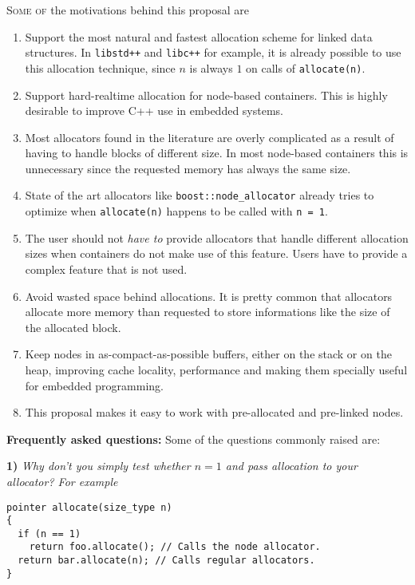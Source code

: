 \documentclass[11pt]{article}
\begin{document}
\textsc{Some of} the motivations behind this proposal are
\begin{enumerate}

\item Support the most natural and fastest allocation scheme for
linked data structures. In \texttt{libstd++} and \texttt{libc++}
for example, it is already possible to use this allocation
technique, since $n$ is always $1$ on calls of \texttt{allocate(n)}.

\item Support hard-realtime allocation for node-based containers.
This is highly desirable to improve C++ use in embedded systems.

\item Most allocators found in the literature are overly
complicated as a result of having to handle blocks of different
size. In most node-based containers this is unnecessary since the
requested memory has always the same size.

\item State of the art allocators like
\texttt{boost::node\_allocator} already tries to optimize when
\texttt{allocate(n)} happens to be called with \texttt{n = 1}. 

\item The user should not {\it have to} provide allocators that
handle different allocation sizes when containers do not make use
of this feature. Users have to provide a complex feature that is
not used.

\item Avoid wasted space behind allocations. It is pretty common that
allocators allocate more memory than requested to store informations
like the size of the allocated block.

\item Keep nodes in as-compact-as-possible buffers, either on the
stack or on the heap, improving cache locality, performance and making
them specially useful for embedded programming.

\item This proposal makes it easy to work with pre-allocated and
pre-linked nodes.
\end{enumerate}

\medskip
\noindent
{\bf Frequently asked questions:} Some of the questions commonly
raised are:

\medskip
\noindent
{\bf 1) }{\it Why don't you simply test whether $n = 1$ and pass
allocation to your allocator? For example}
\begin{lstlisting}
pointer allocate(size_type n)
{
  if (n == 1)
    return foo.allocate(); // Calls the node allocator.
  return bar.allocate(n); // Calls regular allocators.
}
\end{lstlisting}
\end{document}

